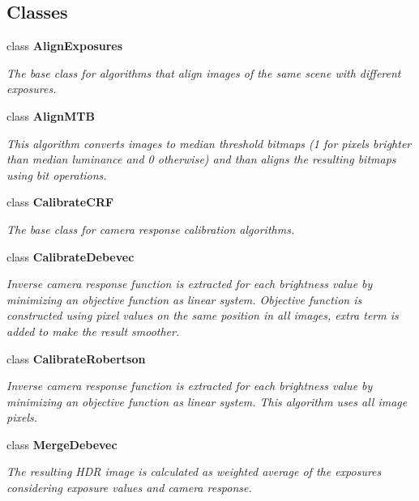 \subsection*{Classes}
\begin{DoxyCompactItemize}
\item 
class {\bfseries Align\+Exposures}
\begin{DoxyCompactList}\small\item\em The base class for algorithms that align images of the same scene with different exposures. \end{DoxyCompactList}\item 
class {\bfseries Align\+M\+TB}
\begin{DoxyCompactList}\small\item\em This algorithm converts images to median threshold bitmaps (1 for pixels brighter than median luminance and 0 otherwise) and than aligns the resulting bitmaps using bit operations. \end{DoxyCompactList}\item 
class {\bfseries Calibrate\+C\+RF}
\begin{DoxyCompactList}\small\item\em The base class for camera response calibration algorithms. \end{DoxyCompactList}\item 
class {\bfseries Calibrate\+Debevec}
\begin{DoxyCompactList}\small\item\em Inverse camera response function is extracted for each brightness value by minimizing an objective function as linear system. Objective function is constructed using pixel values on the same position in all images, extra term is added to make the result smoother. \end{DoxyCompactList}\item 
class {\bfseries Calibrate\+Robertson}
\begin{DoxyCompactList}\small\item\em Inverse camera response function is extracted for each brightness value by minimizing an objective function as linear system. This algorithm uses all image pixels. \end{DoxyCompactList}\item 
class {\bfseries Merge\+Debevec}
\begin{DoxyCompactList}\small\item\em The resulting H\+DR image is calculated as weighted average of the exposures considering exposure values and camera response. \end{DoxyCompactList}\item 

\end{DoxyCompactItemize}
